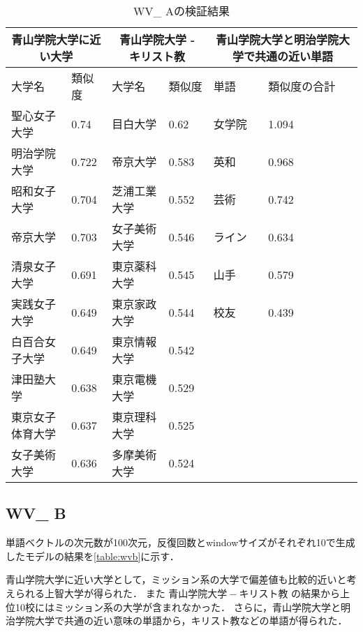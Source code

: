 \begin{table}[H]
\caption{WV\_ Aの検証結果}
\centering
\footnotesize
\begin{tabular}{ll|ll|ll}
\hline
\multicolumn{2}{c}{青山学院大学に近い大学} & \multicolumn{2}{c}{青山学院大学 - キリスト教} & \multicolumn{2}{c}{青山学院大学と明治学院大学で共通の近い単語}
\\ \hline
大学名 & 類似度 & 大学名 & 類似度 & 単語 & 類似度の合計
\\ \hline \hline
聖心女子大学 & 0.74 & 目白大学 & 0.62 & 女学院 & 1.094\\
明治学院大学 & 0.722 & 帝京大学 & 0.583 & 英和 & 0.968\\
昭和女子大学 & 0.704 & 芝浦工業大学 & 0.552 & 芸術 & 0.742\\
帝京大学 & 0.703 & 女子美術大学 & 0.546 & ライン & 0.634\\
清泉女子大学 & 0.691 & 東京薬科大学 & 0.545 & 山手 & 0.579\\
実践女子大学 & 0.649 & 東京家政大学 & 0.544 & 校友 & 0.439\\
白百合女子大学 & 0.649 & 東京情報大学 & 0.542 & & \\
津田塾大学 & 0.638 & 東京電機大学 & 0.529 & & \\
東京女子体育大学 & 0.637 & 東京理科大学 & 0.525 & & \\
女子美術大学 & 0.636 & 多摩美術大学 & 0.524 & & \\ \hline
\end{tabular}
\label{table:wva}
\end{table}



\subsection{WV\_ B}
単語ベクトルの次元数が100次元，反復回数とwindowサイズがそれぞれ10で生成したモデルの結果を\ref{table:wvb}に示す．

青山学院大学に近い大学として，ミッション系の大学で偏差値も比較的近いと考えられる上智大学が得られた．
また $ 青山学院大学 - キリスト教 $ の結果から上位10校にはミッション系の大学が含まれなかった．
さらに，青山学院大学と明治学院大学で共通の近い意味の単語から，キリスト教などの単語が得られた．

